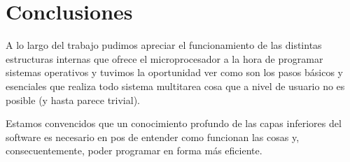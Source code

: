 \section{Conclusiones}

A lo largo del trabajo pudimos apreciar el funcionamiento de las distintas estructuras internas que ofrece el microprocesador a la hora de programar sistemas operativos y tuvimos la oportunidad ver como son los pasos básicos y esenciales que realiza todo sistema multitarea cosa que a nivel de usuario no es posible (y hasta parece trivial). 

Estamos convencidos que un conocimiento profundo de las capas inferiores del software es necesario en pos de entender como funcionan las cosas y, consecuentemente, poder programar en forma más eficiente.